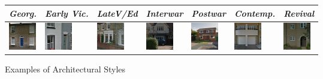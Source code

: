 \documentclass[]{article}
\begin{document}
\begin{figure}[htb!]
\caption{Examples of Architectural Styles}
\begin{tabular}{lllllll}
  \hline
\emph{Georg.} & \emph{Early Vic.} & \emph{LateV/Ed} & \emph{Interwar} & \emph{Postwar} & \emph{Contemp.} & \emph{Revival} \\ 
  \hline
\includegraphics[width=45px]{images//0001000010058205_KqBBtZS8ecncUe8oqjErqQ.jpg} & \includegraphics[width=45px]{images//0001000010102767_u_7T3iAyG9xNgeN_ETY7aQ.jpg} & \includegraphics[width=45px]{images//0001000010141478_FT9houQ2x66NPnNEGxTkvA.jpg} & \includegraphics[width=45px]{images//0001000010065714_pzExlR026vDKdQaJiLkdkw.jpg} & \includegraphics[width=45px]{images//0001000010137600_qYxYCsLRPpOfCyv8IjfnlA.jpg} & \includegraphics[width=45px]{images//1000002057677225_srJnz_31ujVFzn-xh_DYfw.jpg} & \includegraphics[width=45px]{images//1000002500413689_VylY6Sy3vLvjqbtHeryMdQ.jpg} \\ 

\end{tabular}
\end{figure}
\end{document}
